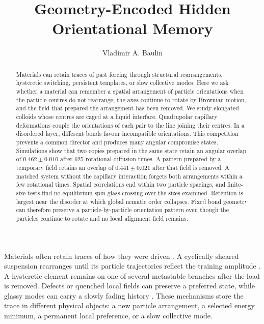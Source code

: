 \documentclass[aps,prl,reprint,superscriptaddress,nofootinbib,floatfix]{revtex4-2}
\begin{document}
\title{Geometry-Encoded Hidden Orientational Memory}

\author{Vladimir A. Baulin}

\date{}

\begin{abstract}
Materials can retain traces of past forcing through structural rearrangements,
hysteretic switching, persistent templates, or slow collective modes. Here we
ask whether a material can remember a spatial arrangement of particle
orientations when the particle centres do not rearrange, the axes continue to
rotate by Brownian motion, and the field that prepared the arrangement has
been removed. We study elongated colloids whose centres are caged at a liquid
interface. Quadrupolar capillary deformations couple the orientations of each
pair to the line joining their centres. In a disordered layer, different bonds
favour incompatible orientations. This competition prevents a common director
and produces many angular compromise states. Simulations show that two copies
prepared in the same state retain an angular overlap of $0.462\pm0.010$ after
625 rotational-diffusion times. A pattern prepared by a temporary field retains
an overlap of $0.441\pm0.021$ after that field is removed. A matched system
without the capillary interaction forgets both arrangements within a few
rotational times. Spatial correlations end within two particle spacings, and
finite-size tests find no equilibrium spin-glass crossing over the sizes
examined. Retention is largest near the disorder at which global nematic order
collapses. Fixed bond geometry can therefore preserve a particle-by-particle
orientation pattern even though the particles continue to rotate and no local
alignment field remains.
\end{abstract}

\maketitle

Materials often retain traces of how they were driven \cite{keim2019}. A cyclically sheared
suspension rearranges until its particle trajectories reflect the training
amplitude \cite{keim2011,paulsen2014}. A hysteretic element remains on one of
several metastable branches after the load is removed. Defects or quenched
local fields can preserve a preferred state, while glassy modes can carry a
slowly fading history \cite{rotunno2005}. These mechanisms store the
trace in different physical objects: a new particle arrangement, a selected
energy minimum, a permanent local preference, or a slow collective mode.
\end{document}

